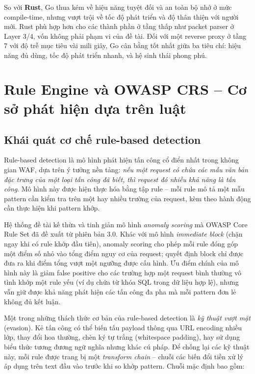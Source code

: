 \documentclass[../DoAn.tex]{subfiles}
\begin{document}
So với \textbf{Rust}, Go thua kém về hiệu năng tuyệt đối và an toàn bộ nhớ
ở mức compile-time, nhưng vượt trội về tốc độ phát triển và độ thân thiện
với người mới. Rust phù hợp hơn cho các thành phần ở tầng thấp như packet
parser ở Layer 3/4, vốn không phải phạm vi của đề tài. Đối với một reverse
proxy ở tầng 7 với độ trễ mục tiêu vài mili giây, Go cân bằng tốt nhất giữa
ba tiêu chí: hiệu năng đủ dùng, tốc độ phát triển nhanh, và hệ sinh thái
phong phú.

\section{Rule Engine và OWASP CRS -- Cơ sở phát hiện dựa trên luật}
\label{section:3.2}

\subsection{Khái quát cơ chế rule-based detection}
\label{subsection:3.2.1}

Rule-based detection là mô hình phát hiện tấn công cổ điển nhất trong không
gian WAF, dựa trên ý tưởng nền tảng: \textit{nếu một request có chứa các mẫu
văn bản đặc trưng của một loại tấn công đã biết, thì request đó nhiều khả
năng là tấn công}. Mô hình này được hiện thực hóa bằng tập rule -- mỗi rule
mô tả một mẫu pattern cần kiểm tra trên một hay nhiều trường của request,
kèm theo hành động cần thực hiện khi pattern khớp.

Hệ thống đề tài kế thừa và tinh giản mô hình \textit{anomaly scoring} mà
OWASP Core Rule Set đã đề xuất từ phiên bản 3.0. Khác với mô hình
\textit{immediate block} (chặn ngay khi có rule khớp đầu tiên), anomaly
scoring cho phép mỗi rule đóng góp một điểm số nhỏ vào tổng điểm nguy cơ
của request; quyết định block chỉ được đưa ra khi điểm tổng vượt một ngưỡng
được cấu hình. Ưu điểm chính của mô hình này là giảm false positive cho các
trường hợp một request bình thường vô tình khớp một rule yếu (ví dụ chứa từ
khóa SQL trong dữ liệu hợp lệ), nhưng vẫn giữ được khả năng phát hiện các
tấn công đa pha mà mỗi pattern đơn lẻ không đủ kết luận.

Một trong những thách thức cơ bản của rule-based detection là \textit{kỹ
thuật vượt mặt} (evasion). Kẻ tấn công có thể biến tấu payload thông qua
URL encoding nhiều lớp, thay đổi hoa thường, chèn ký tự trắng (whitespace
padding), hay sử dụng biểu thức tương đương ngữ nghĩa nhưng khác cú pháp.
Để chống lại các kỹ thuật này, mỗi rule được trang bị một \textit{transform
chain} -- chuỗi các biến đổi tiền xử lý áp dụng trên text đầu vào trước khi
so khớp pattern. Chuỗi mặc định bao gồm:
\end{document}
